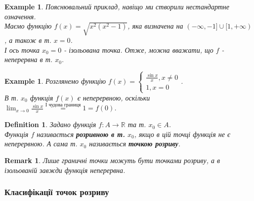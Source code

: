 \documentclass[a4paper, 14pt]{article}
\theoremstyle{theoremdd}
\theoremstyle{theoremdd}
\newtheorem{definition}[theorem]{Definition}
\theoremstyle{theoremdd}
\theoremstyle{theoremdd}
\newtheorem{example}[theorem]{Example}
\theoremstyle{theoremdd}
\theoremstyle{theoremdd}
\newtheorem{remark}[theorem]{Remark}
\theoremstyle{theoremdd}
\theoremstyle{theoremdd}
\begin{document}
\begin{example}
Пояснювальний приклад, навіщо ми створили нестандартне означення.\\
Маємо функцію $f(x) = \sqrt{x^2(x^2-1)}$, яка визначена на $(-\infty,-1] \cup [1,+\infty)$, а також в т. $x = 0$.\\
І ось точка $x_0 = 0$ - ізольована точка. Отже, можна вважати, що $f$ - неперервна в т. $x_0$.
\begin{figure}[H]
\centering
{}
\end{figure}
\end{example}

\begin{example}
Розглянемо функцію $f(x) = \begin{cases} \displaystyle \frac{\sin x}{x}, x \neq 0 \\ 1, x = 0 \end{cases}$.\\
В т. $x_0$ функція $f(x)$ є неперервною, оскільки
$\displaystyle \lim_{x \to 0} \frac{\sin x}{x} \overset{\textrm{I чудова границя}}{=} 1 = f(0)$.
\end{example}

\begin{definition}
Задано функція $f: A \to \mathbb{R}$ та т. $x_0 \in A$.\\
Функція $f$ називається \textbf{розривною в т.} $x_0$, якщо в цій точці функція не є неперервною. А сама т. $x_0$ називається \textbf{точкою розриву}.
\end{definition}

\begin{remark}
Лише граничні точки можуть бути точками розриву, а в ізольованій завжди функція неперервна.
\end{remark}

\subsubsection*{Класифікації точок розриву}
\end{document}
